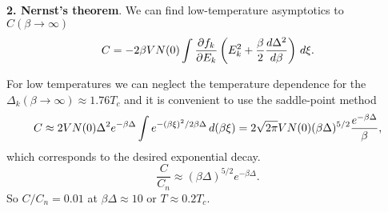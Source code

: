 \textbf{2. Nernst's theorem}. We can find low-temperature asymptotics to $C(\beta \to \infty)$
\begin{equation*}
	C = - 2 \beta V N(0) \int \frac{\partial f_k}{\partial E_k} \left(
		E_k^2 + \frac{\beta}{2} \frac{d \Delta^2}{d \beta} 
	\right) \, d \xi.
\end{equation*}

For low temperatures we can neglect the temperature dependence for the $\Delta_k(\beta \to \infty) \approx 1.76 T_c$ and it is convenient to use the saddle-point method
\begin{equation*}
	C \approx 2 V N(0) \Delta^2 e^{-\beta \Delta} \int e^{- (\beta \xi)^2 / 2 \beta \Delta} \, d (\beta \xi) = 2 \sqrt{2\pi} V N(0) (\beta \Delta)^{5/2} \frac{e^{-\beta \Delta}}{\beta},
\end{equation*}
which corresponds to the desired exponential decay. 
\begin{equation*}
	\frac{C}{C_n} \approx (\beta \Delta)^{5/2} e^{- \beta \Delta}.
\end{equation*}
So $C / C_n = 0.01$ at $\beta \Delta \approx 10$ or $T \approx 0.2 T_c$. 
